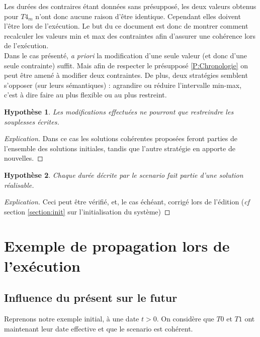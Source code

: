 \documentclass[10pt,a4paper]{article}
\newtheorem{presup}{Hypothèse}
\begin{document}
Les durées des contraires étant données sans présupposé, les deux valeurs obtenus pour $T4_m$ n'ont donc aucune raison d'être identique. Cependant elles doivent l'être lors de l'exécution. Le but du ce document est donc de montrer comment recalculer les valeurs min et max des contraintes afin d'assurer une cohérence lors de l'exécution.\\

Dans le cas présenté, \textit{a priori} la modification d'une seule valeur (et donc d'une seule contrainte) suffit. Mais afin de respecter le présupposé \ref{P:Chronologie} on peut être amené à modifier deux contraintes. De plus, deux stratégies semblent s'opposer (sur leurs sémantiques) : agrandire ou réduire l'intervalle min-max, c'est à dire faire au plus flexible ou au plus restreint.

	\begin{presup}
		Les modifications effectuées ne pourront que restreindre les souplesses écrites. \label{P:modif}
	\end{presup}
	\begin{proof}[Explication]
		Dans ce cas les solutions cohérentes proposées feront parties de l'ensemble des solutions initiales, tandis que l'autre stratégie en apporte de nouvelles.
	\end{proof}

	\begin{presup}
		Chaque durée décrite par le scenario fait partie d'une solution réalisable. \label{P:coherent}
	\end{presup}
	\begin{proof}[Explication]
		Ceci peut être vérifié, et, le cas échéant, corrigé lors de l'édition (\textit{cf} section \ref{section:init} sur l'initialisation du système)
	\end{proof}


\section{Exemple de propagation lors de l'exécution}

	\subsection{Influence du présent sur le futur}
Reprenons notre exemple initial, à une date $t>0$. On considère que $T0$ et $T1$ ont maintenant leur date effective et que le scenario est cohérent.
\end{document}
